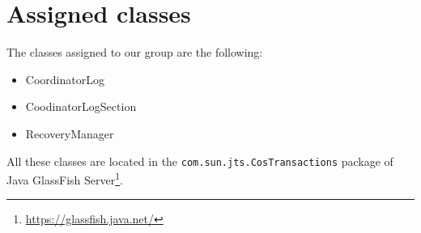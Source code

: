 \section{Assigned classes}
\label{sec:classes}

The classes assigned to our group are the following:
\begin{itemize}
    \item CoordinatorLog
    \item CoodinatorLogSection
    \item RecoveryManager
\end{itemize}

All these classes are located in the \texttt{com.sun.jts.CosTransactions} package of Java GlassFish Server\footnote{\url{https://glassfish.java.net/}}.
